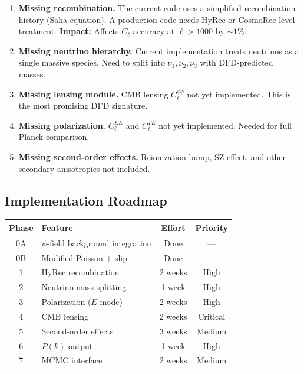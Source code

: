 \documentclass[11pt,a4paper]{article}
\theoremstyle{remark}
\begin{document}
\begin{enumerate}
\item \textbf{Missing recombination.} The current code uses a simplified
  recombination history (Saha equation). A production code needs
  HyRec or CosmoRec-level treatment. \textbf{Impact:} Affects $C_\ell$
  accuracy at $\ell > 1000$ by $\sim 1\%$.

\item \textbf{Missing neutrino hierarchy.} Current implementation treats
  neutrinos as a single massive species. Need to split into
  $\nu_1, \nu_2, \nu_3$ with DFD-predicted masses.

\item \textbf{Missing lensing module.} CMB lensing $C_\ell^{\phi\phi}$
  not yet implemented. This is the most promising DFD signature.

\item \textbf{Missing polarization.} $C_\ell^{EE}$ and $C_\ell^{TE}$
  not yet implemented. Needed for full Planck comparison.

\item \textbf{Missing second-order effects.} Reionization bump,
  SZ effect, and other secondary anisotropies not included.
\end{enumerate}

\subsection{Implementation Roadmap}

\begin{center}
\begin{tabular}{clcc}
\toprule
\textbf{Phase} & \textbf{Feature} & \textbf{Effort} & \textbf{Priority} \\
\midrule
0A & $\psi$-field background integration & Done & --- \\
0B & Modified Poisson + slip & Done & --- \\
1 & HyRec recombination & 2 weeks & High \\
2 & Neutrino mass splitting & 1 week & High \\
3 & Polarization ($E$-mode) & 2 weeks & High \\
4 & CMB lensing & 2 weeks & Critical \\
5 & Second-order effects & 3 weeks & Medium \\
6 & $P(k)$ output & 1 week & High \\
7 & MCMC interface & 2 weeks & Medium \\
\bottomrule
\end{tabular}
\end{center}
\end{document}
